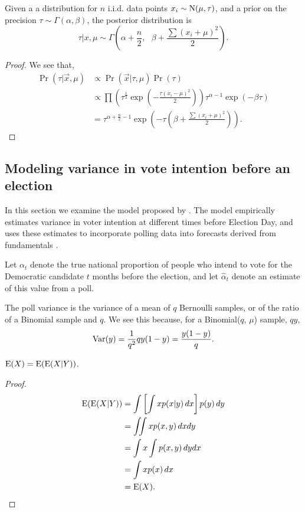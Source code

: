 \documentclass[thesis.tex]{subfiles}
\begin{document}
\begin{lemma*}
Given a a distribution for $n$ i.i.d. data points $x_i \sim \operatorname{N}(\mu, \tau)$, and a prior on the precision $\tau \sim \Gamma(\alpha, \beta)$, the posterior distribution is \[
\tau | x, \mu \sim \Gamma\left(  \alpha + \frac{n}{2}, \text{ } \beta + \frac{\sum(x_i + \mu)^2}{2}  \right).
\]
\end{lemma*}
\begin{proof}
We see that, \begin{align*}
\Pr(\tau | \vec{x}, \mu) &\propto \Pr(\vec{x} | \tau, \mu)\Pr(\tau) \\
&\propto \prod\left(\tau^{\frac{1}{2}}\exp\left(  -\frac{\tau(x_i - \mu)^2}{2}  \right)\right) \tau^{\alpha-1}\exp(-\beta\tau) \\
&= \tau^{\alpha + \frac{n}{2} - 1}\exp\left(  -\tau\left(\beta + \frac{\sum(x_i + \mu)^2}{2}\right)  \right).
\end{align*}
\end{proof}

\subsection{Modeling variance in vote intention before an election}


In this section we examine the model proposed by \cite{Lock:2010aa}. The model empirically estimates variance in voter intention at different times before Election Day, and uses these estimates to incorporate polling data into forecasts derived from fundamentals \citep{Hibbs:2008aa}.

Let \(\alpha_t\) denote the true national proportion of people who intend to vote for the Democratic candidate \(t\) months before the election, and let \(\widehat{\alpha}_t\) denote an estimate of this value from a poll.

The poll variance is the variance of a mean of \(q\) Bernoulli samples, or of the ratio of a Binomial sample and \(q\). We see this because, for a Binomial(\(q\), \(\mu\)) sample, \(qy\), \begin{equation*}\begin{aligned}
  \operatorname{Var}(y) = \frac{1}{q^2}qy(1-y) = \frac{y(1-y)}{q}.
\end{aligned}\end{equation*}

\begin{lemma*}
 \(\operatorname{E} (X) = \operatorname{E}(\operatorname{E}(X | Y))\).
 \end{lemma*}
 \begin{proof}\begin{equation*}
\begin{aligned}
	\operatorname{E}(\operatorname{E}(X | Y)) &= \int \left[\int x p(x | y)\, dx\right] p(y)\, dy \\
	&= \iint x p(x, y)\, dx dy \\
	&= \int x \int p(x, y)\, dy dx \\
	&= \int x p(x) \, dx \\
	&= \operatorname{E}(X).
\end{aligned}
\end{equation*}
\end{proof}
\end{document}
